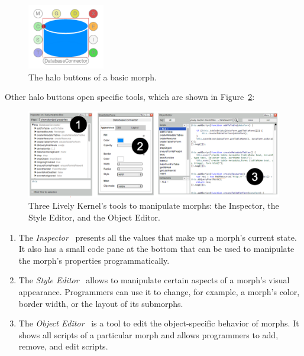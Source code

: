 \begin{figure}[h]
    \centering
    \includegraphics[width=0.3\textwidth]{figures/2_background/1_halos.pdf}
    \caption{The halo buttons of a basic morph.}
    \label{fig:Halos}
\end{figure}

Other halo buttons open specific tools, which are shown in Figure~\ref{fig:LivelyTools}:

\begin{figure}[h]
    \centering
    \includegraphics[width=\textwidth]{figures/2_background/2_LivelyTools.pdf}
    \caption{Three Lively Kernel's tools to manipulate morphs: the Inspector, the Style Editor, and the Object Editor.}
    \label{fig:LivelyTools}
\end{figure}

\begin{enumerate}
    \item The \emph{Inspector}~ presents all the values that make up a morph's current state. It also has a small code pane at the bottom that can be used to manipulate the morph's properties programmatically.
    \item The \emph{Style Editor}~ allows to manipulate certain aspects of a morph's visual appearance. Programmers can use it to change, for example, a morph's color, border width, or the layout of its submorphs.
    \item The \emph{Object Editor}~ is a tool to edit the object-specific behavior of morphs. It shows all scripts of a particular morph and allows programmers to add, remove, and edit scripts.
\end{enumerate}


